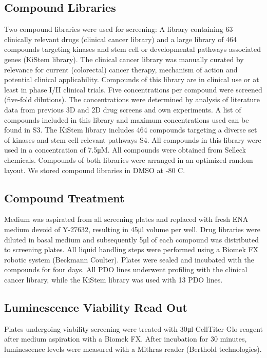 \begin{flushleft}
\subsection{Compound Libraries}
Two compound libraries were used for screening: A library containing 63 clinically relevant drugs (clinical cancer library) and a large library of 464 compounds targeting kinases and stem cell or developmental pathways associated genes (KiStem library). The clinical cancer library was manually curated by relevance for current (colorectal) cancer therapy, mechanism of action and potential clinical applicability. Compounds of this library are in clinical use or at least in phase I/II clinical trials. Five concentrations per compound were screened (five-fold dilutions). The concentrations were determined by analysis of literature data from previous 3D and 2D drug screens and own experiments. A list of compounds included in this library and maximum concentrations used can be found in S3. The KiStem library includes 464 compounds targeting a diverse set of kinases and stem cell relevant pathways S4. All compounds in this library were used in a concentration of 7.5μM. All compounds were obtained from Selleck chemicals. Compounds of both libraries were arranged in an optimized random layout. We stored compound libraries in DMSO at -80 C.

\subsection{Compound Treatment}
Medium was aspirated from all screening plates and replaced with fresh ENA medium devoid of Y-27632, resulting in 45μl volume per well. Drug libraries were diluted in basal medium and subsequently 5μl of each compound was distributed to screening plates. 
All liquid handling steps were performed using a Biomek FX robotic system (Beckmann Coulter). Plates were sealed and incubated with the compounds for four days. All PDO lines underwent profiling with the clinical cancer library, while the KiStem library was used with 13 PDO lines.

\subsection{Luminescence Viability Read Out}
Plates undergoing viability screening were treated with 30μl CellTiter-Glo reagent after medium aspiration with a Biomek FX. After incubation for 30 minutes, luminescence levels were measured with a Mithras reader (Berthold technologies).


\end{flushleft}
